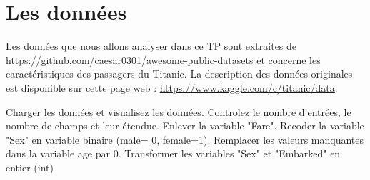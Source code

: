 \documentclass[11pt]{exam}
\begin{document}
 

\section{Les données }
Les données que nous allons analyser dans ce TP sont extraites de \url{https://github.com/caesar0301/awesome-public-datasets} et
concerne les caractéristiques des passagers du Titanic. La description
des données originales est disponible sur cette page web :
\url{https://www.kaggle.com/c/titanic/data}. 



\begin{questions}
  \question Charger les données et visualisez les données. Controlez le
  nombre d'entrées, le nombre de champs et leur étendue.
  \question Enlever la variable "Fare".
  \question Recoder la variable "Sex" en variable binaire (male= 0, female=1).
  \question Remplacer les valeurs manquantes dans la variable age par 0.
  \question Transformer les variables "Sex" et "Embarked" en entier (int)
\end{questions}
\end{document}

